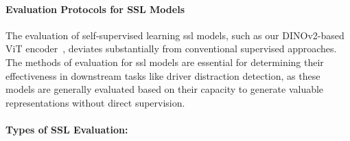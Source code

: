 \paragraph{Evaluation Protocols for SSL Models}
The evaluation of self-supervised learning \gls{ssl} models, such as our DINOv2-based ViT encoder~\citep{dinov2_oquab2023dinov2}, deviates substantially from conventional supervised approaches. The methods of evaluation for \gls{ssl} models are essential for determining their effectiveness in downstream tasks like driver distraction detection, as these models are generally evaluated based on their capacity to generate valuable representations without direct supervision. 

\paragraph{Types of SSL Evaluation:}
